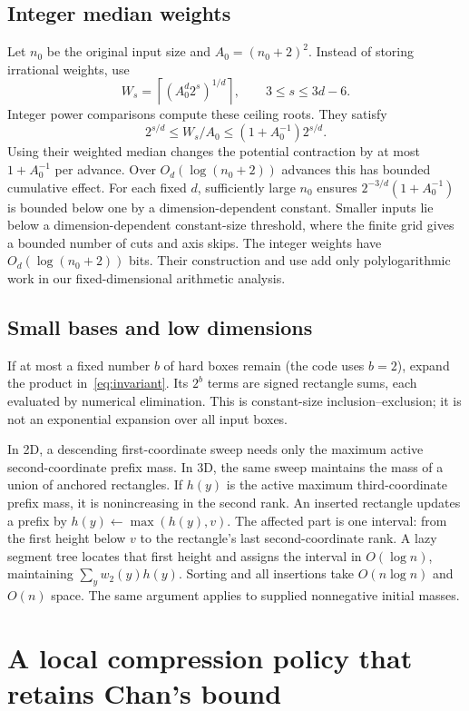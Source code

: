 \documentclass[12pt,a4paper]{article}
\theoremstyle{definition}
\begin{document}
\subsection{Integer median weights}
Let $n_0$ be the original input size and $A_0=(n_0+2)^2$. Instead of
storing irrational weights, use
\begin{equation}
 W_s=\left\lceil(A_0^d2^s)^{1/d}\right\rceil,
 \qquad 3\le s\le3d-6.
 \label{eq:integerweights}
\end{equation}
Integer power comparisons compute these ceiling roots. They satisfy
\[
 2^{s/d}\le W_s/A_0\le(1+A_0^{-1})2^{s/d}.
\]
Using their weighted median changes the potential contraction by at most
$1+A_0^{-1}$ per advance. Over $O_d(\log(n_0+2))$ advances this has
bounded cumulative effect. For each fixed $d$, sufficiently large $n_0$
ensures $2^{-3/d}(1+A_0^{-1})$ is bounded below one by a
dimension-dependent constant. Smaller inputs lie below a
dimension-dependent constant-size threshold, where the finite grid
gives a bounded number of cuts and axis skips. The integer weights have $O_d(\log(n_0+2))$
bits. Their construction and use add only polylogarithmic work in our
fixed-dimensional arithmetic analysis.

\subsection{Small bases and low dimensions}
If at most a fixed number $b$ of hard boxes remain (the code uses $b=2$),
expand the product in~\eqref{eq:invariant}. Its $2^b$ terms are signed
rectangle sums, each evaluated by numerical elimination. This is
constant-size inclusion--exclusion; it is not an exponential expansion
over all input boxes.

In 2D, a descending first-coordinate sweep needs only the maximum active
second-coordinate prefix mass. In 3D, the same sweep maintains the mass
of a union of anchored rectangles. If $h(y)$ is the active maximum
third-coordinate prefix mass, it is nonincreasing in the second rank.
An inserted rectangle updates a prefix by $h(y)\gets\max(h(y),v)$.
The affected part is one interval: from the first height below $v$ to the
rectangle's last second-coordinate rank. A lazy segment tree locates
that first height and assigns the interval in $O(\log n)$, maintaining
$\sum_y w_2(y)h(y)$. Sorting and all insertions take $O(n\log n)$
and $O(n)$ space. The same argument applies to supplied nonnegative
initial masses.

\section{A local compression policy that retains Chan's bound}
\label{sec:complexity}
\end{document}
